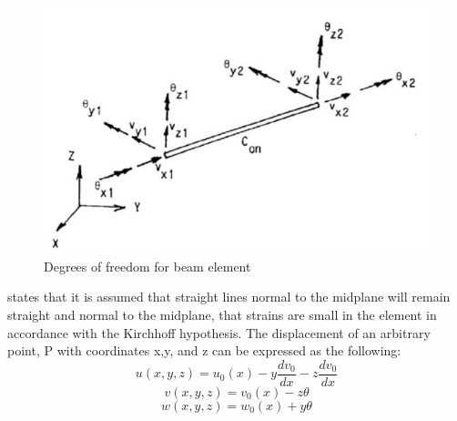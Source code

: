 \begin{figure}[H]
\centering
\includegraphics[scale=0.5]{figures/beamri}
\caption[$\; \:$Beam Element]{Degrees of freedom for beam element\cite{sintef2017} }
 \label{fig:beamri}
\end{figure}

\noindent \cite{sintef2017} states that it is assumed that straight lines normal to the midplane will remain straight and normal to the midplane, that strains are small in the element in accordance with the Kirchhoff hypothesis.\newline
\newline The displacement of an arbitrary point, P with coordinates x,y, and z can be expressed as the following:
\begin{equation}
    u(x,y,z)=u_0(x) - y \frac{dv_0}{dx} - z \frac{dv_0}{dx}
\end{equation}
\begin{equation}
    v(x,y,z)=v_0(x) - z \theta
\end{equation}
\begin{equation}
    w(x,y,z)=w_0(x) + y \theta
\end{equation}



